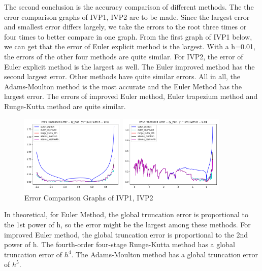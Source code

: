 \documentclass[a4paper]{article}
\begin{document}
	
	The second conclusion is the accuracy comparison of different methods. The the error comparison graphs of IVP1, IVP2 are to be made. Since the largest error and smallest error differs largely, we take the errors to the root three times or four times to better compare in one graph. 
	From the first graph of IVP1 below, we can get that the error of Euler explicit method is the  largest. With a h=0.01, the errors of the other four methods are quite similar. 
	For IVP2, the error of Euler explicit method is the largest as well. The Euler improved method has the second largest error. Other methods have quite similar errors.
	All in all, the Adams-Moulton method is the most accurate and the Euler Method has the largest error. The errors of improved Euler method, Euler trapezium method and Runge-Kutta method are quite similar. 
	
	
	\begin{figure}[htbp]
		\subfigure 
		{
			\begin{minipage}{7cm}
				\centering      
				\includegraphics[width=5cm]{img/ivp1_error.png}
				\caption{\label{fig:ivp1_error} }
			\end{minipage}
		}
		\subfigure 
		{
			\begin{minipage}{7cm}
				\centering      
				\includegraphics[width=5cm]{img/ivp2_error.png}
				\caption{\label{fig:ivp2_error}}
			\end{minipage}
		}
		\caption{Error Comparison Graphs of IVP1, IVP2} 
	\end{figure}
	
	In theoretical, for Euler Method, the global truncation error is proportional to the 1st power of h, so the error might be the largest among these methods. For improved Euler method, the global truncation error is proportional to the 2nd power of h. The fourth-order four-stage Runge-Kutta method has a global truncation error of $h^4$. The Adams-Moulton method has a global truncation error of $h^5$.
	
\end{document}
